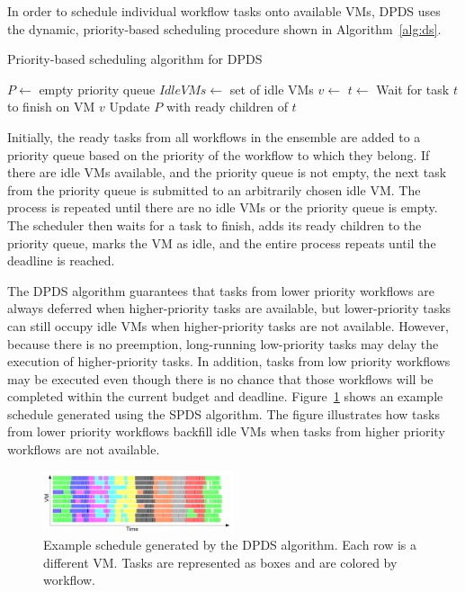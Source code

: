 \documentclass[conference]{IEEEtran}
\begin{document}
In order to schedule individual workflow tasks onto available VMs, DPDS uses the dynamic, priority-based scheduling procedure shown in Algorithm~\ref{alg:ds}.

\begin{algorithm}[tb]
\caption{Priority-based scheduling algorithm for DPDS}
\label{alg:ds}
{\small
\begin{algorithmic}[1]
    \State $P\gets$ empty priority queue
	\State $IdleVMs\gets$ set of idle VMs
    	\State {} 
    \EndFor
    		\State $v\gets$ 
    		\State $t\gets$ 
    		\State {}
    	\EndWhile
    	\State Wait for task $t$ to finish on VM $v$
    	\State Update $P$ with ready children of $t$
		\State {}
    \EndWhile
\EndProcedure
\end{algorithmic}
}
\end{algorithm}

Initially, the ready tasks from all workflows in the ensemble are added to a priority queue based on the priority of the workflow to which they belong. If there are idle VMs available, and the priority queue is not empty, the next task from the priority queue is submitted to an arbitrarily chosen idle VM. The process is repeated until there are no idle VMs or the priority queue is empty. The scheduler then waits for a task to finish, adds its ready children to the priority queue, marks the VM as idle, and the entire process repeats until the deadline is reached.

The DPDS algorithm guarantees that tasks from lower priority workflows are always deferred when higher-priority tasks are available, but lower-priority tasks can still occupy idle VMs when higher-priority tasks are not available. However, because there is no preemption, long-running low-priority tasks may delay the execution of higher-priority tasks. In addition, tasks from low priority workflows may be executed even though there is no chance that those workflows will be completed within the current budget and deadline. Figure~\ref{fig:spds-example} shows an example schedule generated using the SPDS algorithm. The figure illustrates how tasks from lower priority workflows backfill idle VMs when tasks from higher priority workflows are not available.

\begin{figure}[tb]
  \centering
  \includegraphics[width=0.5\textwidth]{figures/spds-gantt}
  \caption[Example schedule generated by the DPDS algorithm.]{Example schedule generated by the DPDS algorithm. Each row is a different VM. Tasks are represented as boxes and are colored by workflow.}
  \label{fig:spds-example}
\end{figure}
\end{document}
